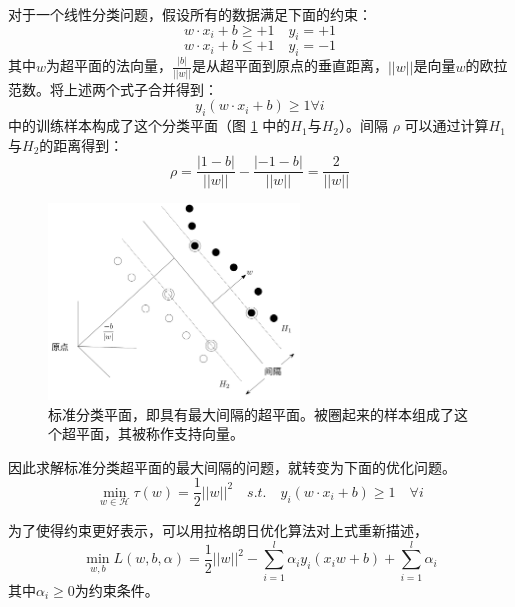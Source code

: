 对于一个线性分类问题，假设所有的数据满足下面的约束：
\begin{equation}
	w\cdot x_i +b \geq + 1 \quad y_i = +1
	\label{equ:constraint1}
\end{equation}
\begin{equation}
	w\cdot x_i +b \leq + 1 \quad y_i = -1
	\label{equ:constraint2}
\end{equation}
其中$w$为超平面的法向量，$\frac{|b|}{||w||}$是从超平面到原点的垂直距离，$||w||$是向量$w$的欧拉范数。将上述两个式子合并得到：
\begin{equation}
	y_i(w\cdot x_i+b)\geq 1 \forall i
	\label{equ:svm}
\end{equation}
 中的训练样本构成了这个分类平面（图 \ref{fig:hyperplanes} 中的$H_1$与$H_2$）。间隔 $\rho$ 可以通过计算$H_1$与$H_2$的距离得到：
\begin{equation}
	\rho=\frac{|1-b|}{||w||}-\frac{|-1-b|}{||w||}=\frac{2}{||w||}
\end{equation}
\begin{figure}[hbt]
	\centering
	\includegraphics[width=6.67cm]{figures/emitter/svm_hard}
	\caption{标准分类平面，即具有最大间隔的超平面。被圈起来的样本组成了这个超平面，其被称作支持向量。}
	\label{fig:hyperplanes}
\end{figure}
因此求解标准分类超平面的最大间隔的问题，就转变为下面的优化问题。
\begin{equation}
	\min \limits_{w\in \mathcal{H}} \tau(w)=\frac{1}{2}||w||^2\quad s.t. \quad y_i(w\cdot x_i +b) \geq 1 \quad \forall i
	\label{equ:optimization}
\end{equation}

为了使得约束更好表示，可以用拉格朗日优化算法对上式重新描述，
\begin{equation}
	\min \limits_{w,b} L(w,b,\alpha)=\frac{1}{2}||w||^2-\sum_{i=1}^l\alpha_i y_i (x_i w + b) + \sum_{i=1}^l{\alpha_i}
	\label{equ:lagrange}
\end{equation}
其中$\alpha_i \geq 0$为约束条件。

